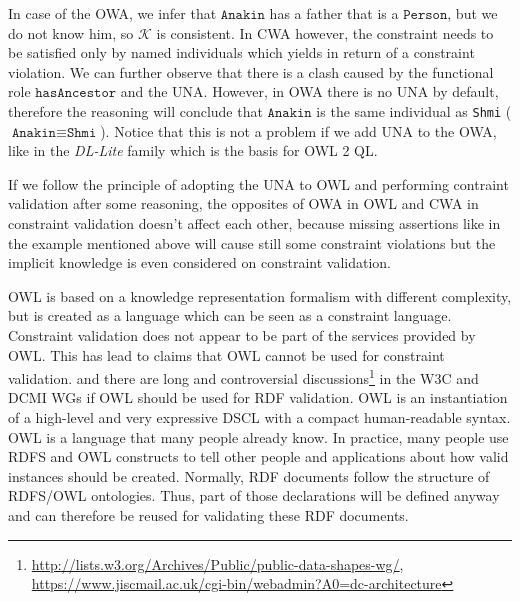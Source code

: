 \documentclass{llncs}
\newcommand{\ms}[1]{\texttt{#1}}
\newcommand{\tb}[1]{\todo[size=\small, color=green!40]{\textbf{Thomas:} #1}}
\begin{document}
In case of the OWA, we infer that $\ms{Anakin}$ has a father that is a $\ms{Person}$, but we do not know him, so $\mathcal{K}$ is consistent. In CWA however, the constraint needs to be satisfied only by named individuals which yields in return of a constraint violation. We can further observe that there is a clash caused by the functional role $\ms{hasAncestor}$ and the UNA. However, in OWA there is no UNA by default, therefore the reasoning will conclude that $\ms{Anakin}$ is the same individual as \ms{Shmi} ($\ms{Anakin} \equiv \ms{Shmi}$). Notice that this is not a problem if we add UNA to the OWA, like in the \textit{DL-Lite} family \cite{Calvanese2007,Artale2009} which is the basis for OWL 2 QL.

If we follow the principle of adopting the UNA to OWL and performing contraint validation after some reasoning, the opposites of OWA in OWL and CWA in constraint validation doesn't affect each other, because missing assertions like in the example mentioned above will cause still some constraint violations but the implicit knowledge is even considered on constraint validation.

\tb{maybe next paragraph in front}

OWL is based on a knowledge representation formalism with different complexity, but is created as a language which can be seen as a constraint language.
Constraint validation does not appear to be part of the services provided by OWL.  
This has lead to claims that OWL cannot be used for constraint validation. 
and there are long and controversial discussions\footnote{\url{http://lists.w3.org/Archives/Public/public-data-shapes-wg/}, \url{https://www.jiscmail.ac.uk/cgi-bin/webadmin?A0=dc-architecture}} in the W3C and DCMI WGs if OWL should be used for RDF validation.
OWL is an instantiation of a high-level and very expressive DSCL with a compact human-readable syntax.
OWL is a language that many people already know.
In practice, many people use RDFS and OWL constructs to tell other people and applications about how valid instances should be created.
Normally, RDF documents follow the structure of RDFS/OWL ontologies. 
Thus, part of those declarations will be defined anyway and can therefore be reused for validating these RDF documents.

%
%
\end{document}
